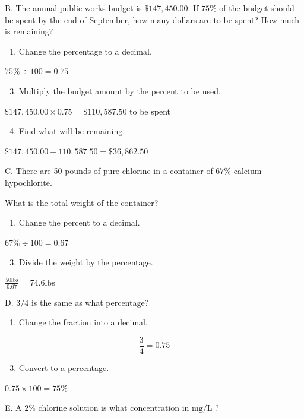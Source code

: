 \documentclass[10pt]{article}
\begin{document}
B. The annual public works budget is $\$ 147,450.00$. If $75 \%$ of the budget should be spent by the end of September, how many dollars are to be spent? How much is remaining?

\begin{enumerate}
  \item Change the percentage to a decimal.
\end{enumerate}
$75 \% \div 100=0.75$

\begin{enumerate}
  \setcounter{enumi}{2}
  \item Multiply the budget amount by the percent to be used.
\end{enumerate}
$\$ 147,450.00 \times 0.75=\$ 110,587.50$ to be spent

\begin{enumerate}
  \setcounter{enumi}{3}
  \item Find what will be remaining.
\end{enumerate}
$\$ 147,450.00-110,587.50=\$ 36,862.50$

C. There are 50 pounds of pure chlorine in a container of $67 \%$ calcium hypochlorite.

What is the total weight of the container?

\begin{enumerate}
  \item Change the percent to a decimal.
\end{enumerate}
$67 \% \div 100=0.67$

\begin{enumerate}
  \setcounter{enumi}{2}
  \item Divide the weight by the percentage.
\end{enumerate}
$\frac{50 \mathrm{lbs}}{0.67}=74.6 \mathrm{lbs}$

D. $3 / 4$ is the same as what percentage?

\begin{enumerate}
  \item Change the fraction into a decimal.
\end{enumerate}
$$
\frac{3}{4}=0.75
$$

\begin{enumerate}
  \setcounter{enumi}{2}
  \item Convert to a percentage.
\end{enumerate}
$0.75 \times 100=75 \%$

E. A $2 \%$ chlorine solution is what concentration in $\mathrm{mg} / \mathrm{L}$ ?
\end{document}
